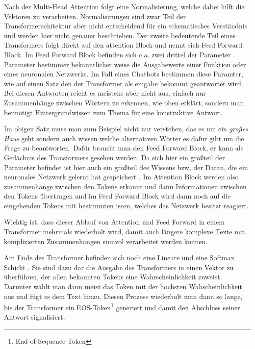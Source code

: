 	Nach der Multi-Head Attention folgt eine Normalisierung, welche dabei hilft die Vektoren zu verarbeiten. 
	Normalisirungen sind zwar Teil der Transformerachitektur aber nicht entscheidend für ein schematisches Verständnis
	und werden hier nicht genauer beschrieben\cite[S.3]{vaswani2017}. 
	\clearpage
	\noindent
	Der zweite bedeutende Teil eines Transformers folgt direkt auf den attention Block und nennt sich Feed Forward Block.
	Im Feed Forward Block befinden sich c.a. zwei drittel der Parameter \cite{geva2024}. Parameter bestimmer bekanntlicher weise
	die Ausgabewerte einer Funktion oder eines neuronalen Netzwerks. Im Fall eines Chatbots bestimmen diese Paramter, wie auf 
	einen Satz den der Transformer als eingabe bekommt geantwortet wird. Bei diesen Antworten reicht es meistens aber nicht aus, 
	einfach nur Zusammenhänge zwischen Wörtern zu erkennen, wie oben erklärt, sondern man bennötigt Hintergrundwissen zum Thema 
	für eine konstruktive Antwort.

	Im obigen Satz muss man zum Beispiel nicht nur verstehen, das es um ein \emph{großes Haus} geht sondern auch wissen welche alternativen
	Wörter es dafür gibt um die Frage zu beantworten. Dafür braucht man den Feed Forward Block, er kann als Gedächnis des Transformers gesehen
	werden. Da sich hier ein großteil der Parameter befindet ist hier auch ein großteil des Wissens bzw. der Datan, die ein neuronales
	Netzwerk gelernt hat gespeichert \cite{geva2024}.
	\vspace{5mm}
	Im Attention Block werden also zusammenhänge zwischen den Tokens erkannt und dann Informationen zwischen den Tokens übertragen
	und im Feed Forward Block wird dann noch auf die eingehenden Tokens mit bestimmten issen, welches das Netzwerk besitzt reagiert.
	
	Wichtig ist, dass dieser Ablauf von Attention und Feed Forward in einem Transformer mehrmals wiederholt wird, damit auch längere komplexe Texte mit
	komplizierten Zusammenhängen sinnvol verarbeitet werden können.
	
	Am Ende des Transformer befinden sich noch eine Lineare und eine Softmax Schicht \cite{aggarwal2018}. Sie sind dazu dar die Ausgabe des Transformers
	in einen Vektor zu überführen, der allen bekannten Tokens eine Wahrscheinlichkeit zuweist. Darunter wählt man dann meist das Token 
	mit der höchsten Wahscheinlichkeit aus und fügt es dem Text hinzu. Diesen Prozess wiederholt man dann so lange, bis der Transformer
	ein EOS-Token\footnote{End-of-Sequence-Token} generiert und damit den Abschluss seiner Antwort signalisiert.
	

